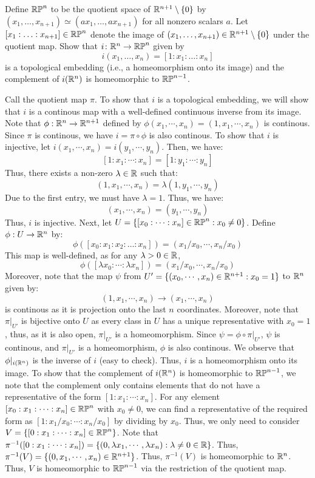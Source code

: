 \documentclass[12pt]{article}
\begin{document}
\begin{problem}{3}
Define $\mathbb{RP}^n$ to be the quotient space of $\mathbb R^{n+1}\setminus \{0\}$ by $(x_1, \hdots, x_{n+1}) \simeq (a x_1, \hdots, a x_{n+1})$ for all nonzero scalars $a$. Let $[x_1: \hdots : x_{n+1}] \in \mathbb{RP}^n$ denote the image of $(x_1, \hdots, x_{n+1}) \in \mathbb{R}^{n+1} \setminus \{ 0 \}$ under the quotient map. Show that $i \colon \mathbb{R}^n \to \mathbb{RP}^n$ given by 
$$ i (x_1, \hdots, x_n) = [1: x_1 : \hdots : x_n ] $$
is a topological embedding (i.e., a homeomorphism onto its image) and the complement of $i(\mathbb{R}^n)$ is homeomorphic to $\mathbb{RP}^{n-1}$.
\end{problem}

\begin{solution}
    Call the quotient map $\pi$. To show that $i$ is a topological embedding, we will show that $i$ is a continous map with a well-defined continuous inverse from its image. \bbni 
    Note that $\phi: \mathbb R^n \to \mathbb R^{n+1}$ defined by $\phi(x_1, \cdots, x_n) = (1, x_1, \cdots, x_n)$ is continous. Since $\pi$ is continous, we have $i = \pi \circ \phi$ is also continous.  \bbni
    To show that $i$ is injective, let $i(x_1, \cdots, x_n) = i(y_1, \cdots, y_n)$. Then, we have:
    \[ [1 : x_1 : \cdots : x_n] = [1 : y_1 : \cdots : y_n] \]
    Thus, there exists a non-zero $\lambda \in \mathbb R$ such that:
    \[ (1, x_1, \cdots, x_n) = \lambda(1, y_1, \cdots, y_n) \]
    Due to the first entry, we must have $\lambda = 1$. Thus, we have:
    \[ (x_1, \cdots, x_n) = (y_1, \cdots, y_n) \]
    Thus, $i$ is injective. Next, let $U = \{[x_0 : \cdots : x_n] \in \mathbb{RP}^n : x_0 \neq 0 \}$. Define $\phi: U \to \mathbb R^n$ by: 
    \[ \phi([x_0 : x_1: x_2: \hdots : x_{n}]) = (x_1/x_0, \cdots, x_{n}/x_0) \]
    This map is well-defined, as for any $\lambda > 0 \in \mathbb R$, 
    \[ \phi([\lambda x_0 : \cdots : \lambda x_n]) = (x_1/x_0, \cdots, x_{n}/x_0) \]
    Moreover, note that the map $\psi$ from $U' = \{(x_0, \cdots, x_n) \in \mathbb R^{n+1} : x_0 = 1\}$ to $\mathbb R^n$ given by:
    \[ (1, x_1, \cdots, x_n) \to (x_1, \cdots, x_{n}) \]
    is continous as it is projection onto the last $n$ coordinates. Moreover, note that $\pi|_{U'}$ is bijective onto $U$ as every class in $U$ has a unique representative with $x_0 = 1$, thus, as it is also open, $\pi|_{U'}$ is a homeomorphism. Since $\psi = \phi \circ \pi|_{U'}$, $\psi$ is continous, and $\pi|_{U'}$ is a homeomorphism, $\phi$ is also continous. \bbni 
    We observe that $\phi|_{i(\mathbb R^n)}$ is the inverse of $i$ (easy to check). Thus, $i$ is a homeomorphism onto its image. \bbni
    To show that the complement of $i(\mathbb R^n)$ is homeomorphic to $\mathbb{RP}^{n-1}$, we note that the complement only contains elements that do not have a representative of the form $[1 : x_1 : \cdots : x_n]$. For any element $[x_0 : x_1 : \cdots : x_n] \in \mathbb{RP}^n$ with $x_0 \neq 0$, we can find a representative of the required form as $[1 : x_1/x_0 : \cdots : x_n/x_0]$ by dividing by $x_0$. Thus, we only need to consider $V = \{[0 : x_1 : \cdots : x_n] \in \mathbb{RP}^n\}$. Note that $\pi^{-1}([0 : x_1 : \cdots : x_n]) = \{ (0, \lambda x_1, \cdots, \lambda x_n) : \lambda \neq 0 \in \mathbb R\}$. Thus, $\pi^{-1}(V) = \{(0, x_1, \cdots, x_n) \in \mathbb R^{n+1}\}$. Thus, $\pi^{-1}(V)$ is homeomorphic to $\mathbb R^n$. Thus, $V$ is homeomorphic to $\mathbb{RP}^{n-1}$ via the restriction of the quotient map.

\end{solution}
\end{document}
